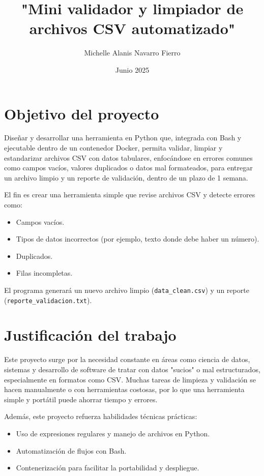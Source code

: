 \documentclass[10pt]{article}
\title{"Mini validador y limpiador de archivos CSV automatizado"}
\author{Michelle Alanis Navarro Fierro}
\date{Junio 2025}
\begin{document}
\maketitle

\section*{Objetivo del proyecto}
Diseñar y desarrollar una herramienta en Python que, integrada con Bash y ejecutable dentro de un contenedor Docker, permita validar, limpiar y estandarizar archivos CSV con datos tabulares, enfocándose en errores comunes como campos vacíos, valores duplicados o datos mal formateados, para entregar un archivo limpio y un reporte de validación, dentro de un plazo de 1 semana.

El fin es crear una herramienta simple que revise archivos CSV y detecte errores como:

\begin{itemize}
    \item Campos vacíos.
    \item Tipos de datos incorrectos (por ejemplo, texto donde debe haber un número).
    \item Duplicados.
    \item Filas incompletas.
\end{itemize}

El programa generará un nuevo archivo limpio (\texttt{data\_clean.csv}) y un reporte (\texttt{reporte\_validacion.txt}).

\section*{Justificación del trabajo}
Este proyecto surge por la necesidad constante en áreas como ciencia de datos, sistemas y desarrollo de software de tratar con datos "sucios" o mal estructurados, especialmente en formatos como CSV. Muchas tareas de limpieza y validación se hacen manualmente o con herramientas costosas, por lo que una herramienta simple y portátil puede ahorrar tiempo y errores.

Además, este proyecto refuerza habilidades técnicas prácticas:

\begin{itemize}
    \item Uso de expresiones regulares y manejo de archivos en Python.
    \item Automatización de flujos con Bash.
    \item Contenerización para facilitar la portabilidad y despliegue.
    
\end{itemize}
\end{document}
